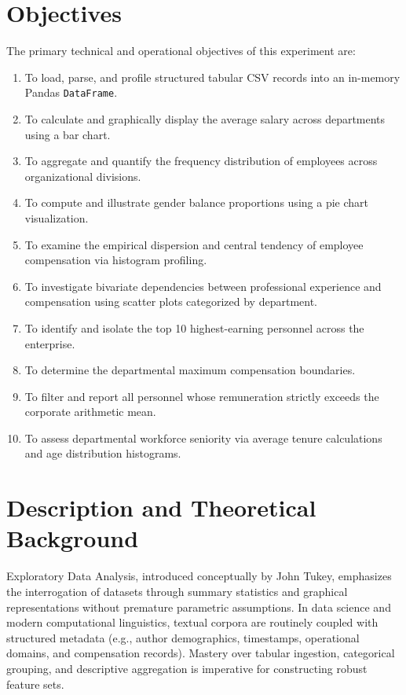 \documentclass[12pt,a4paper]{report}
\begin{document}
\section{Objectives}
The primary technical and operational objectives of this experiment are:
\begin{enumerate}[label=\textbf{\arabic*.}]
    \item To load, parse, and profile structured tabular CSV records into an in-memory Pandas \texttt{DataFrame}.
    \item To calculate and graphically display the average salary across departments using a bar chart.
    \item To aggregate and quantify the frequency distribution of employees across organizational divisions.
    \item To compute and illustrate gender balance proportions using a pie chart visualization.
    \item To examine the empirical dispersion and central tendency of employee compensation via histogram profiling.
    \item To investigate bivariate dependencies between professional experience and compensation using scatter plots categorized by department.
    \item To identify and isolate the top 10 highest-earning personnel across the enterprise.
    \item To determine the departmental maximum compensation boundaries.
    \item To filter and report all personnel whose remuneration strictly exceeds the corporate arithmetic mean.
    \item To assess departmental workforce seniority via average tenure calculations and age distribution histograms.
\end{enumerate}

\section{Description and Theoretical Background}
Exploratory Data Analysis, introduced conceptually by John Tukey, emphasizes the interrogation of datasets through summary statistics and graphical representations without premature parametric assumptions. In data science and modern computational linguistics, textual corpora are routinely coupled with structured metadata (e.g., author demographics, timestamps, operational domains, and compensation records). Mastery over tabular ingestion, categorical grouping, and descriptive aggregation is imperative for constructing robust feature sets.
\end{document}
